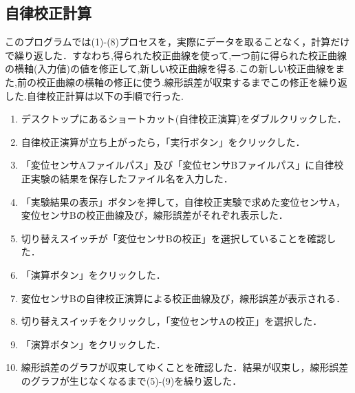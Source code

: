 \subsection{自律校正計算}
このプログラムでは(1)-(8)プロセスを，実際にデータを取ることなく，計算だけで繰り返した．すなわち,得られた校正曲線を使って,一つ前に得られた校正曲線の横軸(入力値)の値を修正して,新しい校正曲線を得る.この新しい校正曲線をまた,前の校正曲線の横軸の修正に使う.線形誤差が収束するまでこの修正を繰り返した.自律校正計算は以下の手順で行った.

\begin{enumerate}
    \item デスクトップにあるショートカット(自律校正演算)をダブルクリックした．
    \item 自律校正演算が立ち上がったら，「実行ボタン」をクリックした．
    \item 「変位センサAファイルパス」及び「変位センサBファイルパス」に自律校正実験の結果を保存したファイル名を入力した．
    \item 「実験結果の表示」ボタンを押して，自律校正実験で求めた変位センサA，変位センサBの校正曲線及び，線形誤差がそれぞれ表示した．
    \item 切り替えスイッチが「変位センサBの校正」を選択していることを確認した．
    \item 「演算ボタン」をクリックした．
    \item 変位センサBの自律校正演算による校正曲線及び，線形誤差が表示される．
    \item 切り替えスイッチをクリックし，「変位センサAの校正」を選択した．
    \item 「演算ボタン」をクリックした．
    \item 線形誤差のグラフが収束してゆくことを確認した．結果が収束し，線形誤差のグラフが生じなくなるまで(5)-(9)を繰り返した．
\end{enumerate}